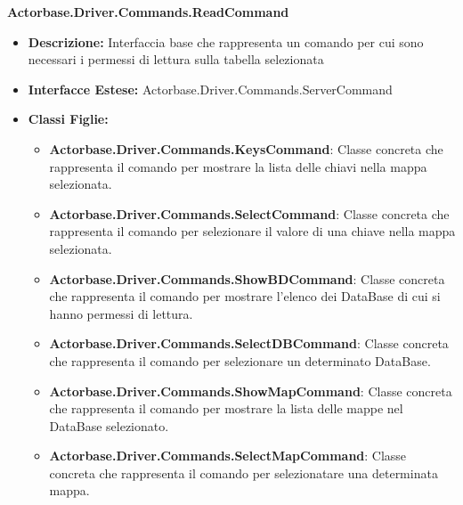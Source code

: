 \documentclass[a4paper]{article}
\begin{document}
		\textbf{Actorbase.Driver.Commands.ReadCommand}
		\begin{itemize}
				\item \textbf{Descrizione:} Interfaccia base che rappresenta un comando per cui sono necessari i permessi di lettura sulla tabella selezionata
				\item \textbf{Interfacce Estese:} Actorbase.Driver.Commands.ServerCommand
				\item \textbf{Classi Figlie:}
					\begin{itemize}
						\item \textbf{Actorbase.Driver.Commands.KeysCommand}:
							Classe concreta che rappresenta il comando per mostrare la lista delle chiavi nella mappa selezionata.
						\item \textbf{Actorbase.Driver.Commands.SelectCommand}:
							Classe concreta che rappresenta il comando per selezionare il valore di una chiave nella mappa selezionata.
						\item \textbf{Actorbase.Driver.Commands.ShowBDCommand}:
							Classe concreta che rappresenta il comando per mostrare l'elenco dei DataBase di cui si hanno permessi di lettura.
						\item \textbf{Actorbase.Driver.Commands.SelectDBCommand}:
							Classe concreta che rappresenta il comando per selezionare un determinato DataBase.
						\item \textbf{Actorbase.Driver.Commands.ShowMapCommand}:
							Classe concreta che rappresenta il comando per mostrare la lista delle mappe nel DataBase selezionato.
						\item \textbf{Actorbase.Driver.Commands.SelectMapCommand}:
							Classe concreta che rappresenta il comando per selezionatare una determinata mappa.
					\end{itemize}
			\end{itemize}
\end{document}
